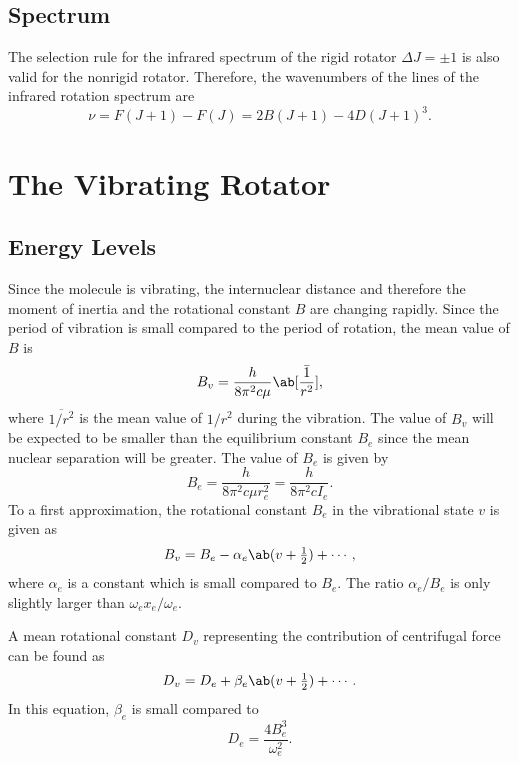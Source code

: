 \subsection{Spectrum}

The selection rule for the infrared spectrum of the rigid rotator $\Delta{}J = \pm 1$ is also valid for the nonrigid rotator. Therefore, the wavenumbers of the lines of the infrared rotation spectrum are
\begin{equation*}
    \nu = F(J + 1) - F(J) = 2B(J + 1) - 4D(J + 1)^{3}.
\end{equation*}

\section{The Vibrating Rotator}
\label{s:the_vibrating_rotator}

\subsection{Energy Levels}

Since the molecule is vibrating, the internuclear distance and therefore the moment of inertia and the rotational constant $B$ are changing rapidly. Since the period of vibration is small compared to the period of rotation, the mean value of $B$ is
\begin{equation*}
    B_{v} = \frac{h}{8\pi^{2}c\mu}\ab[\bar{\frac{1}{r^{2}}}],
\end{equation*}
where $\overline{1/r^{2}}$ is the mean value of $1/r^{2}$ during the vibration. The value of $B_{v}$ will be expected to be smaller than the equilibrium constant $B_{e}$ since the mean nuclear separation will be greater. The value of $B_{e}$ is given by
\begin{equation*}
    B_{e} = \frac{h}{8\pi^{2}c\mu{}r_{e}^{2}} = \frac{h}{8\pi^{2}cI_{e}}.
\end{equation*}
To a first approximation, the rotational constant $B_{e}$ in the vibrational state $v$ is given as
\begin{equation*}
    B_{v} = B_{e} - \alpha_{e}\ab(v + \tfrac{1}{2}) + \dotsb,
\end{equation*}
where $\alpha_{e}$ is a constant which is small compared to $B_{e}$. The ratio $\alpha_{e}/B_{e}$ is only slightly larger than $\omega_{e}x_{e}/\omega_{e}$.

A mean rotational constant $D_{v}$ representing the contribution of centrifugal force can be found as
\begin{equation*}
    D_{v} = D_{e} + \beta_{e}\ab(v + \tfrac{1}{2}) + \dotsb.
\end{equation*}
In this equation, $\beta_{e}$ is small compared to
\begin{equation*}
    D_{e} = \frac{4B_{e}^{3}}{\omega_{e}^{2}}.
\end{equation*}

